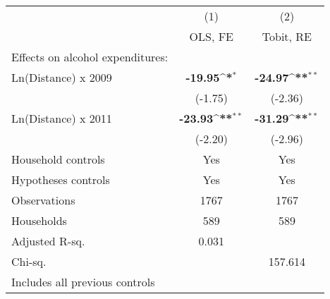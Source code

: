 {
\def\sym#1{\ifmmode^{#1}\else\(^{#1}\)\fi}
\begin{tabular}{l*{2}{c}}
\hline\hline
                    &\multicolumn{1}{c}{(1)}&\multicolumn{1}{c}{(2)}\\
                    &\multicolumn{1}{c}{OLS, FE}&\multicolumn{1}{c}{Tobit, RE}\\
\hline
Effects on alcohol expenditures:&                    &                    \\
Ln(Distance) x 2009 &      \textbf{-19.95\sym{*}} &      \textbf{-24.97\sym{**}}\\
                    &     (-1.75)        &     (-2.36)        \\
Ln(Distance) x 2011 &      \textbf{-23.93\sym{**}}&      \textbf{-31.29\sym{**}}\\
                    &     (-2.20)        &     (-2.96)        \\
Household controls  &         Yes        &         Yes        \\
Hypotheses controls &         Yes        &         Yes        \\
\hline
Observations        &        1767        &        1767        \\
Households          &         589        &         589        \\
Adjusted R-sq.      &       0.031        &                    \\
Chi-sq.             &                    &     157.614        \\
\hline\hline
\multicolumn{3}{l}{\footnotesize \tiny{Includes all previous controls}}\\
\end{tabular}
}
